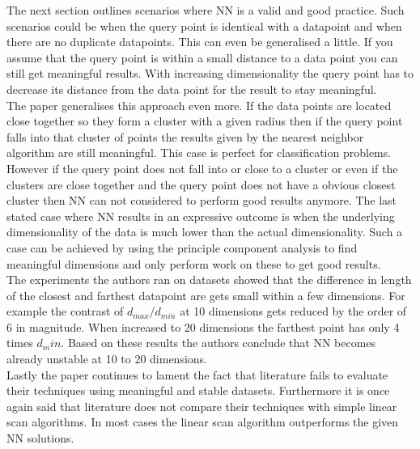 \documentclass[a4paper,psfig,subfigure,epsfig,fleqn,amssmb,float,caption,fontenc,ausarbeitung]{article}
\begin{document}
The next section outlines scenarios where NN is a valid and good practice. Such scenarios could be when the query point is identical with a datapoint and when there are no duplicate datapoints. This can even be generalised a little. If you assume that the query point is within a small distance to a data point you can still get meaningful results. With increasing dimensionality the query point has to decrease its distance from the data point for the result to stay meaningful. \\
The paper generalises this approach even more. If the data points are located close together so they form a cluster with a given radius then if the query point falls into that cluster of points the results given by the nearest neighbor algorithm are still meaningful. This case is perfect for classification problems. However if the query point does not fall into or close to a cluster or even if the clusters are close together and the query point does not have a obvious closest cluster then NN can not considered to perform good results anymore.
The last stated case where NN results in an expressive outcome is when the underlying dimensionality of the data is much lower than the actual dimensionality. Such a case can be achieved by using the principle component analysis to find meaningful dimensions and only perform work on these to get good results. \\
The experiments the authors ran on datasets showed that the difference in length of the closest and farthest datapoint are gets small within a few dimensions. For example the contrast of $ d_{max} / d_{min} $ at 10 dimensions gets reduced by the order of 6 in magnitude. When increased to 20 dimensions the farthest point has only 4 times $ d_min $. Based on these results the authors conclude that NN becomes already unstable at 10 to 20 dimensions.\\
Lastly the paper continues to lament the fact that literature fails to evaluate their techniques using meaningful and stable datasets. Furthermore it is once again said that literature does not compare their techniques with simple linear scan algorithms. In most cases the linear scan algorithm outperforms the given NN solutions.



\fontsize{9}{10pt}


\end{document}
